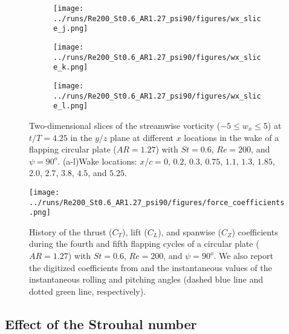 \begin{figure}
\begin{subfigure}[t]{0.24\textwidth}
    \centering
    \texttt{[image: ../runs/Re200\_St0.6\_AR1.27\_psi90/figures/wx\_slice\_j.png]}
    \caption{}
  \end{subfigure}
  \begin{subfigure}[t]{0.24\textwidth}
    \centering
    \texttt{[image: ../runs/Re200\_St0.6\_AR1.27\_psi90/figures/wx\_slice\_k.png]}
    \caption{}
  \end{subfigure}
  \begin{subfigure}[t]{0.24\textwidth}
    \centering
    \texttt{[image: ../runs/Re200\_St0.6\_AR1.27\_psi90/figures/wx\_slice\_l.png]}
    \caption{}
  \end{subfigure}
  \caption{Two-dimensional slices of the streamwise vorticity ($-5 \leq w_x \leq 5$) at $t / T = 4.25$ in the $y/z$ plane at different $x$ locations in the wake of a flapping circular plate ($AR = 1.27$) with $St = 0.6$, $Re = 200$, and $\psi = 90^o$. (a-l)Wake locations: $x / c = 0$, $0.2$, $0.3$, $0.75$, $1.1$, $1.3$, $1.85$, $2.0$, $2.7$, $3.8$, $4.5$, and $5.25$.}
  \label{fig:baseline_wx_slices}
\end{figure}

\begin{figure}
  \centering
  \texttt{[image: ../runs/Re200\_St0.6\_AR1.27\_psi90/figures/force\_coefficients.png]}
  \caption{History of the thrust ($C_T$), lift ($C_L$), and spanwise ($C_Z$) coefficients during the fourth and fifth flapping cycles of a circular plate ($AR = 1.27$) with $St = 0.6$, $Re = 200$, and $\psi = 90^o$. We also report the digitized coefficients from \cite{li_dong_2016} and the instantaneous values of the instantaneous rolling and pitching angles (dashed blue line and dotted green line, respectively).}
  \label{fig:baseline_force_coefficients}
\end{figure}

\subsection{Effect of the Strouhal number}

